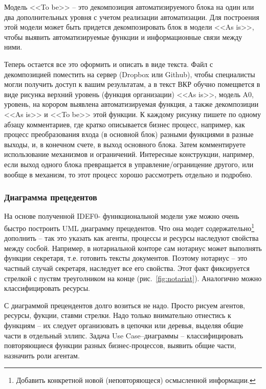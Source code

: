 \documentclass[a4paper,14pt,final]{extreport}
\begin{document}
Модель <<To be>> -- это декомпозиция автоматизируемого блока на один или два дополнительных уровня с учетом реализации автоматизации.  Для построения этой модели может быть придется декомпозировать блок в модели <<As is>>, чтобы выявить автоматизируемые функции и информационные связи между ними.

Теперь остается все это оформить и описать в виде текста.  Файл с декомпозицией поместить на сервер (Dropbox или Github), чтобы специалисты могли получить доступ к вашим результатам, а в текст ВКР обучно помещвется в виде рисунка верхний уровень (функция организации) <<As is>>, модель A0, уровень, на корором выявлена автоматизируемая функция, а также декомпозиции <<As is>> и <<To be>> этой функции.  К каждому рисунку пишете по одному абзацу комментариев, где кратко описывается бизнес процесс, например, как процесс преобразования входа (в основной блок) разными функциями в разные выходы, и, в конечном счете, в выход основного блока.  Затем комментируете использование механизмов и ограничений.  Интересные конструкции, например, если выход одного блока превращается в управление/ограницение другого, или вообще в механизм, то этот процесс хорошо рассмотреть отдельно и подробно.

\subsubsection{Диаграмма прецедентов}
\label{sec:umlusecase}

На основе полученной IDEF0- фуннкциональной модели уже можно очень быстро построить UML диаграмму прецедентов.  Что она модет содержательно\footnote{Добавить конкретной новой (неповторяющеся) осмысленной информации.} дополнить -- так это указать как агенты, процессы и ресурсы наследуют свойства между сосбой.  Например, в нотариальной конторе сам нотариус может выполнять функции секретаря, т.е. готовить тексты документов.  Поэтому нотариус -- это частный случай секретаря, наследует все его свойства.  Этот факт фиксируется стрелкой с пуствм треуголником на конце (рис.~\ref{fig:notariat}).  Аналогично можно классифицировать ресурсы.

С диаграммой прецендентов долго возиться не надо.  Просто рисуем агентов, ресурсы, фукции, ставми стрелки.  Надо только внимательно отнестись к функциям -- их следует организовать в цепочки или деревья, выделяя общие части в отдельный эллипс.  Задача Use Case\;--\;диаграммы -- классифицировать повторяющиеся функции разных бизнес-процессов, выявить общие части, назначить роли агентам.
\end{document}
